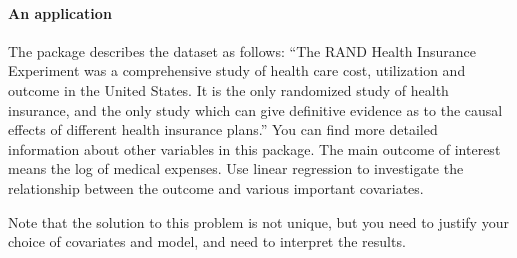  


\paragraph{An application}

The  package  \citep{toomet2008sample} describes the dataset  as follows: ``The RAND Health Insurance Experiment was a comprehensive study of health care cost, utilization and outcome in the United States. It is the only randomized study of health insurance, and the only study which can give definitive evidence as to the causal effects of different health insurance plans.'' You can find more detailed information about other variables in this package. The main outcome of interest  means the log of medical expenses. Use linear regression to investigate the relationship between the outcome and various important covariates. 

Note that the solution to this problem is not unique, but you need to justify your choice of covariates and model, and need to interpret the results. 


